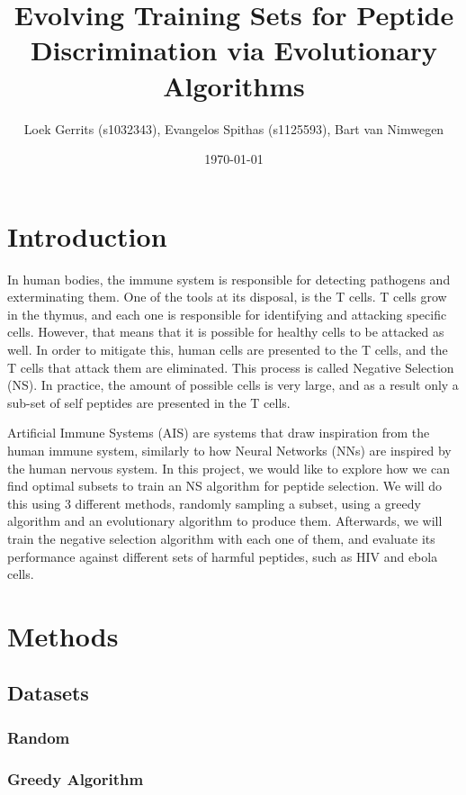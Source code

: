 \documentclass{article}
\title{Evolving Training Sets for Peptide Discrimination via Evolutionary Algorithms}
\author{Loek Gerrits (s1032343), Evangelos Spithas (s1125593), Bart van Nimwegen}
\date{\today}
\begin{document}
 

\maketitle

\section{Introduction}
In human bodies, the immune system is responsible for detecting pathogens and exterminating them. 
One of the tools at its disposal, is the T cells. T cells grow in the thymus, and each one is responsible for
identifying and attacking specific cells. However, that means that it is possible for healthy cells to be
attacked as well. In order to mitigate this, human cells are presented to the T cells, and the T cells that attack them 
are eliminated. This process is called Negative Selection (NS). In practice, the amount of possible cells is very large, and as a result only a sub-set of self peptides are presented
in the T cells. 

Artificial Immune Systems (AIS) are systems that draw inspiration from the human immune system, similarly to how Neural 
Networks (NNs) are inspired by the human nervous system. In this project, we would like to explore how we can find 
optimal subsets to train an NS algorithm for peptide selection. We will do this using 3 different methods, randomly 
sampling a subset, using a greedy algorithm and an evolutionary algorithm to produce them. Afterwards, we will train the 
negative selection algorithm with each one of them, and evaluate its performance against different sets of harmful 
peptides, such as HIV and ebola cells. 



\section{Methods}

\subsection{Datasets} \label{datasets}

\subsubsection{Random}


\subsubsection{Greedy Algorithm}
\end{document}
